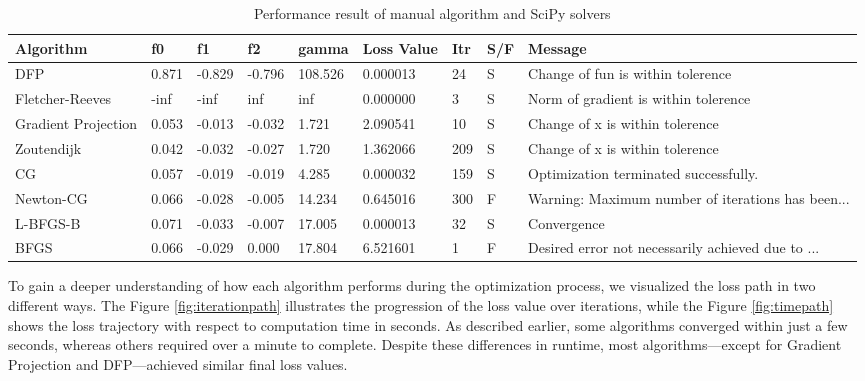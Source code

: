 \documentclass[12pt]{article}
\begin{document}
\label{sec:results-data}
\begin{sidewaystable}
\centering

\begin{tabular}{|l |l |l |l |l |l |l |l |l|}\hline       
 Algorithm & f0 & f1 & f2 & gamma & Loss Value & Itr& S/F& Message\\\hline
 DFP & 0.871& -0.829& -0.796& 108.526& 0.000013
& 24& S& Change of fun is within tolerence
\\\hline
  Fletcher-Reeves& -inf& -inf& inf& inf& 0.000000
& 3& S& Norm of gradient is within tolerence
\\\hline
  Gradient Projection & 0.053& -0.013& -0.032& 1.721& 2.090541
& 10& S& Change of x is within tolerence
\\\hline
  Zoutendijk & 0.042& -0.032& -0.027& 1.720& 1.362066
& 209& S& Change of x is within tolerence
\\\hline
 CG & 0.057& -0.019& -0.019& 4.285& 0.000032
& 159& S& Optimization terminated successfully.
\\\hline
  Newton-CG & 0.066& -0.028& -0.005& 14.234& 0.645016
& 300& F& Warning: Maximum number of iterations has been...
\\\hline
  L-BFGS-B & 0.071& -0.033& -0.007& 17.005& 0.000013
& 32& S& Convergence\\\hline
  BFGS & 0.066& -0.029& 0.000& 17.804& 6.521601
& 1& F& Desired error not necessarily achieved due to ...
\\ \hline

\end{tabular}
  \caption{Performance result of manual algorithm and SciPy solvers }
  \label{tab:summary}
\end{sidewaystable}
\clearpage
To gain a deeper understanding of how each algorithm performs during the optimization process, we visualized the loss path in two different ways. The Figure \ref{fig:iterationpath} illustrates the progression of the loss value over iterations, while the Figure \ref{fig:timepath} shows the loss trajectory with respect to computation time in seconds.
 As described earlier, some algorithms converged within just a few seconds, whereas others required over a minute to complete. Despite these differences in runtime, most algorithms—except for Gradient Projection and DFP—achieved similar final loss values.
\end{document}
